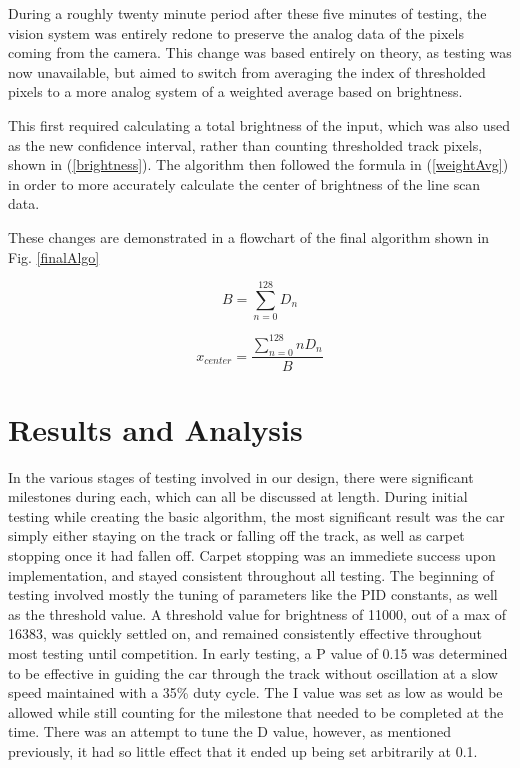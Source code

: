 \documentclass[conference]{IEEEtran}
\begin{document}
    During a roughly twenty minute period after these five minutes of testing, the vision system was entirely redone to preserve the analog
    data of the pixels coming from the camera.
    This change was based entirely on theory, as testing was now unavailable, but aimed to switch from averaging the index of thresholded pixels
    to a more analog system of a weighted average based on brightness.

    This first required calculating a total brightness of the input, which was also used as the new confidence interval, rather than counting
    thresholded track pixels, shown in (\ref{brightness}).
    The algorithm then followed the formula in (\ref{weightAvg}) in order to more accurately calculate the center of brightness of the line scan
    data.

    These changes are demonstrated in a flowchart of the final algorithm shown in Fig. \ref{finalAlgo}

\begin{equation}
    B = {\sum_{n=0}^{128}D_{n}}
    \label{brightness}
\end{equation}

\begin{equation}
    x_{center} = \frac{\sum_{n=0}^{128}nD_{n}}{B}
    \label{weightAvg}
\end{equation}

\section{Results and Analysis}
    In the various stages of testing involved in our design, there were significant milestones during each, which can all be discussed at length.
    During initial testing while creating the basic algorithm, the most significant result was the car simply either staying on the track or
    falling off the track, as well as carpet stopping once it had fallen off.
    Carpet stopping was an immediete success upon implementation, and stayed consistent throughout all testing.
    The beginning of testing involved mostly the tuning of parameters like the PID constants, as well as the threshold value.
    A threshold value for brightness of 11000, out of a max of 16383, was quickly settled on, and remained consistently effective throughout most testing until competition.
    In early testing, a P value of 0.15 was determined to be effective in guiding the car through the track without oscillation at a slow speed maintained with a 35\% duty cycle.
    The I value was set as low as would be allowed while still counting for the milestone that needed to be completed at the time.
    There was an attempt to tune the D value, however, as mentioned previously, it had so little effect that it ended up being set arbitrarily at 0.1.
\end{document}

